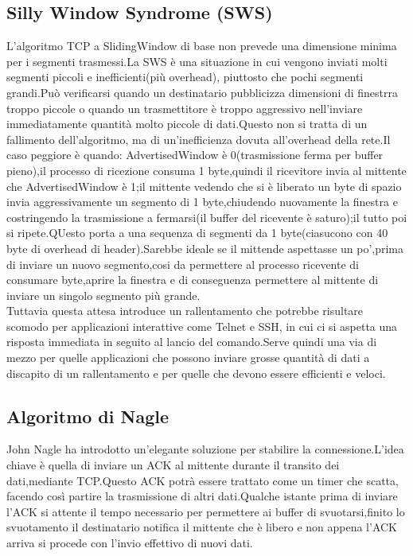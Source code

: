 \subsection{Silly Window Syndrome (SWS)}
L'algoritmo TCP a SlidingWindow di base non prevede una dimensione minima per i segmenti trasmessi.La SWS è una situazione in cui vengono inviati molti segmenti piccoli e inefficienti(più overhead), piuttosto che pochi segmenti grandi.Può verificarsi quando un destinatario pubblicizza dimensioni di finestrra troppo piccole o quando un trasmettitore è troppo aggressivo nell'inviare immediatamente quantità molto piccole di dati.Questo non si tratta di un fallimento dell'algoritmo, ma di un'inefficienza dovuta all'overhead della rete.Il caso peggiore è quando: AdvertisedWindow è 0(trasmissione ferma per buffer pieno),il processo di ricezione consuma 1 byte,quindi il ricevitore invia al mittente che AdvertisedWindow è 1;il mittente vedendo che si è liberato un byte di spazio invia aggressivamente un segmento di 1 byte,chiudendo nuovamente la finestra e costringendo la trasmissione a fermarsi(il buffer del ricevente è saturo);il tutto poi si ripete.QUesto porta a una sequenza di segmenti da 1 byte(ciasucono con 40 byte di overhead di header).Sarebbe ideale se il mittende aspettasse un po',prima di inviare un nuovo segmento,cosi da permettere al processo ricevente di consumare byte,aprire la finestra e di conseguenza permettere al mittente di inviare un singolo segmento più grande. \\
Tuttavia questa attesa introduce un rallentamento che potrebbe risultare scomodo per applicazioni interattive come Telnet e SSH, in cui ci si aspetta una risposta immediata in seguito al lancio del comando.Serve quindi una via di mezzo per quelle applicazioni che possono inviare grosse quantità di dati a discapito di un rallentamento e per quelle che devono essere efficienti e veloci.
\subsection{Algoritmo di Nagle}
John Nagle ha introdotto un'elegante soluzione per stabilire la connessione.L'idea chiave è quella di inviare un ACK al mittente durante il transito dei dati,mediante TCP.Questo ACK potrà essere trattato come un timer che scatta, facendo così partire la trasmissione di altri dati.Qualche istante prima di inviare l'ACK si attente il tempo necessario per permettere ai buffer di svuotarsi,finito lo svuotamento il destinatario notifica il mittente che è libero e non appena l'ACK arriva si procede con l'invio effettivo di nuovi dati.
